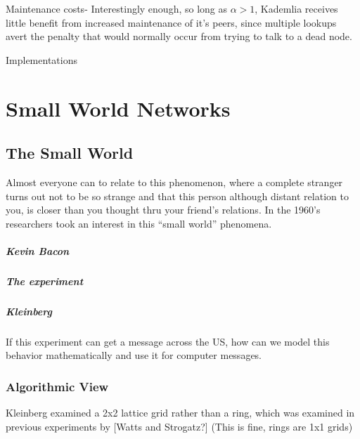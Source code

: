 \documentclass[10pt,letterpaper]{report}
\begin{document}
Maintenance costs-  Interestingly enough, so long as $\alpha >1$, Kademlia receives little benefit from increased maintenance of it's peers, since multiple lookups avert the penalty that would normally occur from trying to talk to a dead node.


Implementations


\chapter{Small World Networks}
\section{The Small World}

Almost everyone can to relate to this phenomenon, where a complete stranger turns out not to be so strange and that this person although distant relation to you, is closer than you thought thru your friend's relations.  In the 1960's researchers took an interest in this ``small world'' phenomena.	


\paragraph{Kevin Bacon}
\paragraph{The experiment}
\paragraph{Kleinberg}
If this experiment can get a message across the US, how can we model this behavior mathematically and use it for computer messages.


\subsection{Algorithmic View}



Kleinberg examined a 2x2 lattice grid rather than a ring, which was examined in previous experiments by [Watts and Strogatz?]  (This is fine, rings are 1x1 grids)
\end{document}
